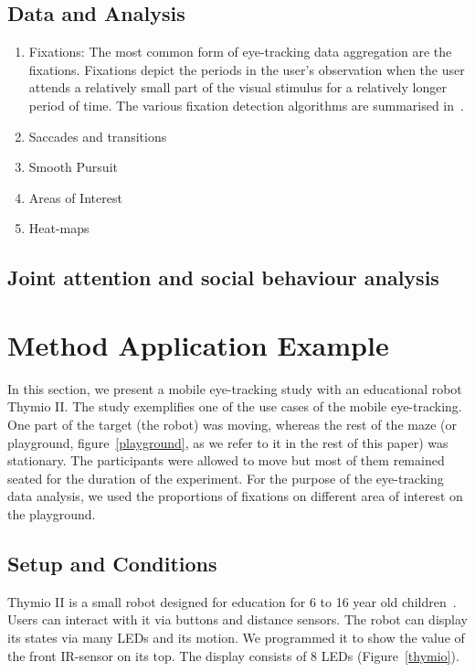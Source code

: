 \documentclass{sig-alternate}
\begin{document}
\subsection{Data and Analysis}

\begin{enumerate}
\item Fixations: The most common form of eye-tracking data aggregation are the fixations.
Fixations depict the periods in the user's observation when the user
attends a relatively small part of the visual stimulus for a relatively
longer period of time. The various fixation detection algorithms are
summarised in~\cite{duchowski2007eye}. 

\item Saccades and transitions
\item Smooth Pursuit
\item Areas of Interest
\item Heat-maps

\end {enumerate}


\subsection{Joint attention and social behaviour analysis}


\section{Method Application Example}
In this section, we present a mobile eye-tracking study with an educational robot Thymio II. The study exemplifies one of the use cases of the mobile eye-tracking. One part of the target (the robot) was moving, whereas the rest of the maze (or playground, figure~\ref{playground}, as we refer to it in the rest of this paper) was stationary. The participants were allowed to move but most of them remained seated for the duration of the experiment. For the purpose of the eye-tracking data analysis, we used the proportions of fixations on different  area of interest on the playground.

\subsection{Setup and Conditions}

Thymio II is a small robot designed for education for 6 to 16 year old
children~\cite{magnenat2012programming, riedo2012two}. Users can interact with
it via buttons and distance sensors. The robot can display its states via many
LEDs and its motion. We programmed it to show the value of the front IR-sensor
on its top. The display consists of 8 LEDs (Figure~\ref{thymio}).
\end{document}

